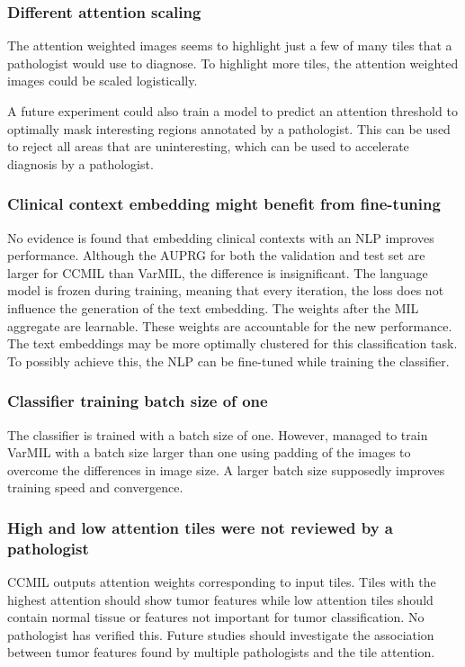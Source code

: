 \subsubsection{Different attention scaling}
The attention weighted images seems to highlight just a few of many tiles that a pathologist would use to diagnose.
To highlight more tiles, the attention weighted images could be scaled logistically.

A future experiment could also train a model to predict an attention threshold to optimally mask interesting regions annotated by a pathologist.
This can be used to reject all areas that are uninteresting, which can be used to accelerate diagnosis by a pathologist.

\subsubsection{Clinical context embedding might benefit from fine-tuning}
No evidence is found that embedding clinical contexts with an NLP improves performance.
Although the AUPRG for both the validation and test set are larger for CCMIL than VarMIL, the difference is insignificant.
The language model is frozen during training, meaning that every iteration, the loss does not influence the generation of the text embedding.
The weights after the MIL aggregate are learnable.
These weights are accountable for the new performance.
The text embeddings may be more optimally clustered for this classification task.
To possibly achieve this, the NLP can be fine-tuned while training the classifier.

\subsubsection{Classifier training batch size of one}
The classifier is trained with a batch size of one.
However,  managed to train VarMIL with a batch size larger than one using padding of the images to overcome the differences in image size.
A larger batch size supposedly improves training speed and convergence.

\subsubsection{High and low attention tiles were not reviewed by a pathologist}
CCMIL outputs attention weights corresponding to input tiles.
Tiles with the highest attention should show tumor features while low attention tiles should contain normal tissue or features not important for tumor classification.
No pathologist has verified this.
Future studies should investigate the association between tumor features found by multiple pathologists and the tile attention.
